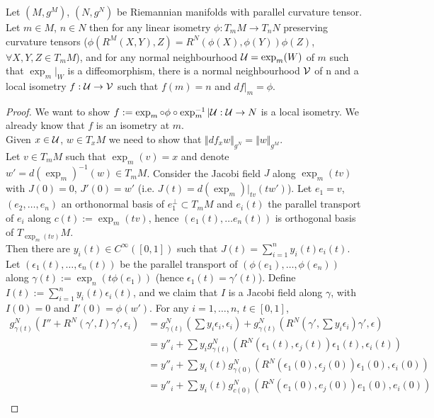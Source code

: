 \documentclass[10pt,a4paper]{article}
\begin{document}
\begin{theorem}
Let $(M,g^M)$, $(N,g^N)$ be Riemannian manifolds with parallel curvature tensor. Let $m\in M$, $n\in N$ then for any linear isometry $\phi: T_mM\to T_nN$ preserving curvature tensors ($\phi(R^M(X,Y),Z) = R^N(\phi(X),\phi(Y))\phi(Z)$, $\forall X,Y,Z\in T_m M$), and for any normal neighbourhood $\mathcal{U} = \exp_m(W)$ of $m$ such that $\exp_m\vert_W$ is a diffeomorphism, there is a normal neighbourhood $\mathcal{V}$ of n and a local isometry $f:\mathcal{U}\to\mathcal{V}$ such that $f(m)=n$ and $df\vert_m = \phi$.
\end{theorem}
\begin{proof}
We want to show $f:= \exp_m\circ \phi \circ \exp_m^{-1}\vert \mathcal{U}: \mathcal{U}\to N	$ is a local isometry. We already know that $f$ is an isometry at $m$.\\
Given $x\in \mathcal{U}$, $w\in T_x M$ we need to show that $\Vert df_x w\Vert_{g^N} = \Vert w\Vert_{g^M}$.\\
Let $v\in T_mM$ such that $\exp_m(v) = x$ and denote $w' = d(\exp_m)^{-1}(w)\in T_mM$. Consider the Jacobi field $J$ along $\exp_m(tv)$ with $J(0)=0$, $J'(0) = w'$ (i.e. $J(t) = d(\exp_m)\vert_{tv}(tw')$). Let $e_1 = v$, $(e_2,\ldots, e_n)$ an orthonormal basis of $e_1^\perp\subset T_m M$ and $e_i(t)$ the parallel transport of $e_i$ along $c(t):= \exp_m(tv)$, hence $(e_1(t),\ldots e_n(t))$ is orthogonal basis of $T_{\exp_m(tv)} M$.\\
Then there are $y_i(t)\in C^\infty([0,1])$ such that $J(t) = \sum_{i=1}^n y_i(t)e_i(t)$.\\
Let $(\epsilon_1(t),\ldots, \epsilon_n(t))$ be the parallel transport of $(\phi(e_1),\ldots, \phi(e_n))$ along $\gamma(t) :=\exp_n(t\phi(e_1))$ (hence $\epsilon_1(t) = \gamma'(t)$). Define $I(t) := \sum_{i=1}^n y_i(t)\epsilon_i(t)$, and we claim that $I$ is a Jacobi field  along $\gamma$, with $I(0) = 0$ and $I'(0) = \phi(w')$. For any $i= 1,\ldots,n$, $t\in [0,1]$,
\begin{align*}
g^N_{\gamma(t)}\left(I'' + R^N(\gamma',I)\gamma', \epsilon_i\right) &= g^N_{\gamma(t)}\left(\sum y_i\epsilon_i,\epsilon_i\right) + g^N_{\gamma(t)}\left(R^N(\gamma', \sum y_i\epsilon_i)\gamma', \epsilon\right)\\
&= y''_i + \sum y_i g^N_{\gamma(t)}(R^N(\epsilon_1(t),\epsilon_j(t))\epsilon_1(t),\epsilon_i(t))\\
&= y''_i + \sum y_i(t) g^N_{\gamma(0)}(R^N(\epsilon_1(0),\epsilon_j(0))\epsilon_1(0),\epsilon_i(0))\\
&=y''_i + \sum y_i(t) g^N_{c(0)}(R^N(e_1(0),e_j(0))e_1(0),e_i(0))\\

\end{align*}
\end{proof}
\end{document}
